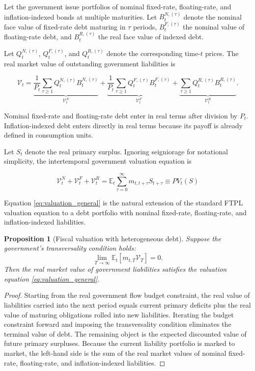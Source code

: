\documentclass[12pt,a4paper]{article}
\newtheorem{proposition}{Proposition}
\begin{document}
Let the government issue portfolios of nominal fixed-rate, floating-rate, and
inflation-indexed bonds at multiple maturities. Let $B_t^{N,(\tau)}$ denote the nominal
face value of fixed-rate debt maturing in $\tau$ periods, $B_t^{F,(\tau)}$ the nominal
value of floating-rate debt, and $B_t^{R,(\tau)}$ the real face value of indexed debt.

Let $Q_t^{N,(\tau)}$, $Q_t^{F,(\tau)}$, and $Q_t^{R,(\tau)}$ denote the corresponding
time-$t$ prices. The real market value of outstanding government liabilities is

\begin{equation}
\mathcal{V}_t
=
\underbrace{
\frac{1}{P_t}
\sum_{\tau\geq 1}
Q_t^{N,(\tau)}
B_t^{N,(\tau)}
}_{\mathcal{V}_t^N}
+
\underbrace{
\frac{1}{P_t}
\sum_{\tau\geq 1}
Q_t^{F,(\tau)}
B_t^{F,(\tau)}
}_{\mathcal{V}_t^F}
+
\underbrace{
\sum_{\tau\geq 1}
Q_t^{R,(\tau)}
B_t^{R,(\tau)}
}_{\mathcal{V}_t^R}.
\label{eq:market_value}
\end{equation}


Nominal fixed-rate and floating-rate debt enter in real terms after division by $P_t$.
Inflation-indexed debt enters directly in real terms because its payoff is already
defined in consumption units.

Let $S_t$ denote the real primary surplus. Ignoring seigniorage for notational
simplicity, the intertemporal government valuation equation is

\begin{equation}
\boxed{
\mathcal{V}_t^N+\mathcal{V}_t^F+\mathcal{V}_t^R
=
\mathbb{E}_t
\sum_{\tau=0}^{\infty}
m_{t,t+\tau}
S_{t+\tau}
\equiv
PV_t(S)
}
\label{eq:valuation_general}
\end{equation}


Equation \eqref{eq:valuation_general} is the natural extension of the standard FTPL
valuation equation to a debt portfolio with nominal fixed-rate, floating-rate, and
inflation-indexed liabilities.


\begin{proposition}[Fiscal valuation with heterogeneous debt]
Suppose the government's transversality condition holds:
\begin{equation}
\lim_{T\to\infty}
\mathbb{E}_t
\left[
m_{t,T}\mathcal{V}_T
\right]
=
0.
\end{equation}
Then the real market value of government liabilities satisfies the valuation equation
\eqref{eq:valuation_general}.
\end{proposition}


\begin{proof}
Starting from the real government flow budget constraint, the real value of liabilities
carried into the next period equals current primary deficits plus the real value of
maturing obligations rolled into new liabilities. Iterating the budget constraint forward
and imposing the transversality condition eliminates the terminal value of debt. The
remaining object is the expected discounted value of future primary surpluses. Because
the current liability portfolio is marked to market, the left-hand side is the sum of the
real market values of nominal fixed-rate, floating-rate, and inflation-indexed liabilities.
\end{proof}
\end{document}
